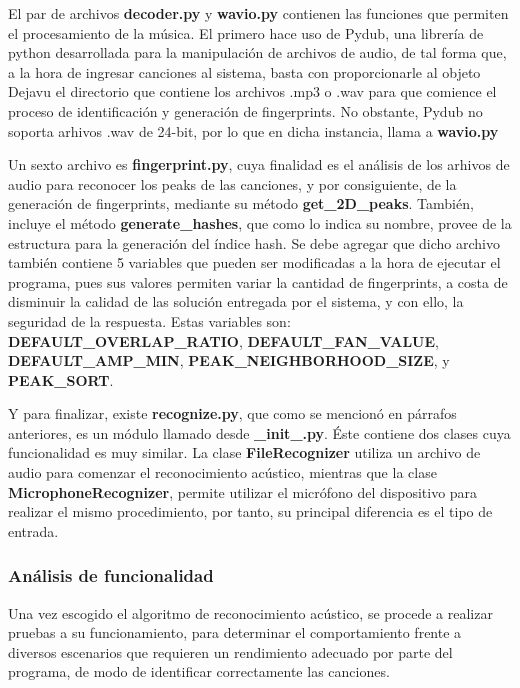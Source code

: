 El par de archivos \textbf{decoder.py} y \textbf{wavio.py} contienen las funciones que permiten el procesamiento de la música. El primero hace uso de Pydub, una librería de python desarrollada para la manipulación de archivos de audio, de tal forma que, a la hora de ingresar canciones al sistema, basta con proporcionarle al objeto Dejavu el directorio que contiene los archivos .mp3 o .wav para que comience el proceso de identificación y generación de fingerprints. No obstante, Pydub no soporta arhivos .wav de 24-bit, por lo que en dicha instancia, llama a \textbf{wavio.py}
 
Un sexto archivo es \textbf{fingerprint.py}, cuya finalidad es el análisis de los arhivos de audio para reconocer los peaks de las canciones, y por consiguiente, de la generación de fingerprints, mediante su método \textbf{get\_2D\_peaks}. También, incluye el método \textbf{generate\_hashes}, que como lo indica su nombre, provee de la estructura para la generación del índice hash. Se debe agregar que dicho archivo también contiene 5 variables que pueden ser modificadas a la hora de ejecutar el programa, pues sus valores permiten variar la cantidad de fingerprints, a costa de disminuir la calidad de las solución entregada por el sistema, y con ello, la seguridad de la respuesta. Estas variables son: \textbf{DEFAULT\_OVERLAP\_RATIO}, \textbf{DEFAULT\_FAN\_VALUE}, \textbf{DEFAULT\_AMP\_MIN}, \textbf{PEAK\_NEIGHBORHOOD\_SIZE}, y \textbf{PEAK\_SORT}.
 
Y para finalizar, existe \textbf{recognize.py}, que como se mencionó en párrafos anteriores, es un módulo llamado desde \textbf{\_init\_.py}. Éste contiene dos clases cuya funcionalidad es muy similar. La clase \textbf{FileRecognizer} utiliza un archivo de audio para comenzar el reconocimiento acústico, mientras que la clase \textbf{MicrophoneRecognizer}, permite utilizar el micrófono del dispositivo para realizar el mismo procedimiento, por tanto, su principal diferencia es el tipo de entrada.



\subsubsection{Análisis de funcionalidad}
Una vez escogido el algoritmo de reconocimiento acústico, se procede a realizar pruebas a su funcionamiento, para determinar el comportamiento frente a diversos escenarios que requieren un rendimiento adecuado por parte del programa, de modo de identificar correctamente las canciones.

